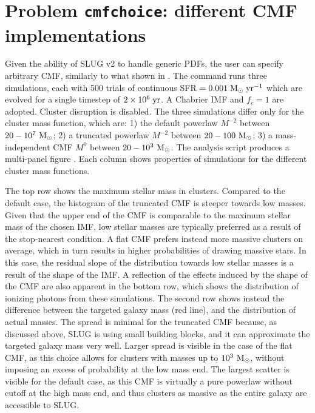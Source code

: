 \documentclass[letterpaper,10pt,english]{sphinxmanual}
\begin{document}
\section{Problem \texttt{cmfchoice}: different CMF implementations}
\label{tests:problem-cmfchoice-different-cmf-implementations}
Given the ability of SLUG v2 to handle generic PDFs, the user can specify arbitrary CMF,
similarly to what shown in  {\hyperref[tests:probimf-label]{\emph{}}}.
The command   runs three  simulations, each with 500 trials
of continuous  SFR \(=0.001\rm\;M_\odot\;yr^{-1}\) which are evolved for a
single timestep of  \(2\times 10^6\rm\;yr\). A Chabrier IMF and \(f_c=1\)
are adopted. Cluster disruption is disabled. The three simulations
differ only for the cluster mass function, which are:
1) the default powerlaw \(M^{-2}\) between \(20-10^{7}~\rm M_\odot\);
2) a truncated powerlaw \(M^{-2}\) between \(20-100~\rm M_\odot\);
3) a mass-independent CMF \(M^{0}\) between \(20-10^3~\rm M_\odot\).
The analysis script  produces a multi-panel figure
. Each column shows properties of simulations for the different
cluster mass functions.

The top row shows the maximum stellar mass in clusters. Compared to the default case,
the histogram of the truncated CMF is steeper towards low masses. Given that the upper end of the
CMF is comparable to the maximum stellar mass of the chosen IMF, low stellar masses are typically
preferred  as a result of the stop-nearest condition. A flat CMF
prefers instead more massive clusters on average, which in turn results in higher probabilities
of drawing massive stars. In this case, the residual slope of the distribution towards
low stellar masses is a result of the shape of the IMF. A reflection of the effects induced by the
shape of the CMF are also apparent in the bottom row, which shows the distribution of
ionizing photons from these simulations. The second row shows instead the difference
between the targeted galaxy mass (red line), and the distribution of actual masses.
The spread is minimal for the truncated CMF because, as discussed above, SLUG is using
small building blocks, and it can approximate the targeted galaxy mass very well.
Larger spread is visible in the case of the flat CMF, as this choice allows for clusters with masses
up to \(10^3~\rm M_\odot\), without imposing an excess of probability at the low
mass end. The largest scatter is visible for the default case, as this CMF is virtually
a pure powerlaw without cutoff at the high mass end, and thus clusters as massive as the entire galaxy
are accessible to SLUG.
\end{document}
